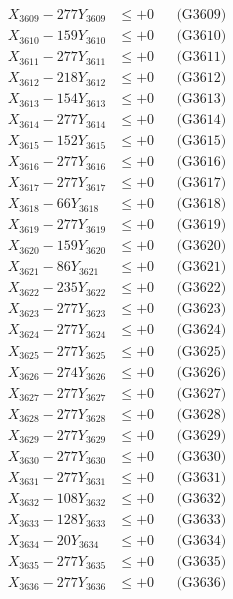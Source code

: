 \documentclass[a4paper,10pt]{article}
\begin{document}
{\begin{align}
X_{3609} - 277Y_{3609} &\leq +0 && \text{(G3609)} \\
X_{3610} - 159Y_{3610} &\leq +0 && \text{(G3610)} \\
\allowbreak
X_{3611} - 277Y_{3611} &\leq +0 && \text{(G3611)} \\
X_{3612} - 218Y_{3612} &\leq +0 && \text{(G3612)} \\
X_{3613} - 154Y_{3613} &\leq +0 && \text{(G3613)} \\
X_{3614} - 277Y_{3614} &\leq +0 && \text{(G3614)} \\
X_{3615} - 152Y_{3615} &\leq +0 && \text{(G3615)} \\
X_{3616} - 277Y_{3616} &\leq +0 && \text{(G3616)} \\
X_{3617} - 277Y_{3617} &\leq +0 && \text{(G3617)} \\
X_{3618} - 66Y_{3618} &\leq +0 && \text{(G3618)} \\
X_{3619} - 277Y_{3619} &\leq +0 && \text{(G3619)} \\
X_{3620} - 159Y_{3620} &\leq +0 && \text{(G3620)} \\
\allowbreak
X_{3621} - 86Y_{3621} &\leq +0 && \text{(G3621)} \\
X_{3622} - 235Y_{3622} &\leq +0 && \text{(G3622)} \\
X_{3623} - 277Y_{3623} &\leq +0 && \text{(G3623)} \\
X_{3624} - 277Y_{3624} &\leq +0 && \text{(G3624)} \\
X_{3625} - 277Y_{3625} &\leq +0 && \text{(G3625)} \\
X_{3626} - 274Y_{3626} &\leq +0 && \text{(G3626)} \\
X_{3627} - 277Y_{3627} &\leq +0 && \text{(G3627)} \\
X_{3628} - 277Y_{3628} &\leq +0 && \text{(G3628)} \\
X_{3629} - 277Y_{3629} &\leq +0 && \text{(G3629)} \\
X_{3630} - 277Y_{3630} &\leq +0 && \text{(G3630)} \\
\allowbreak
X_{3631} - 277Y_{3631} &\leq +0 && \text{(G3631)} \\
X_{3632} - 108Y_{3632} &\leq +0 && \text{(G3632)} \\
X_{3633} - 128Y_{3633} &\leq +0 && \text{(G3633)} \\
X_{3634} - 20Y_{3634} &\leq +0 && \text{(G3634)} \\
X_{3635} - 277Y_{3635} &\leq +0 && \text{(G3635)} \\
X_{3636} - 277Y_{3636} &\leq +0 && \text{(G3636)} \\

\end{align}}
\end{document}
